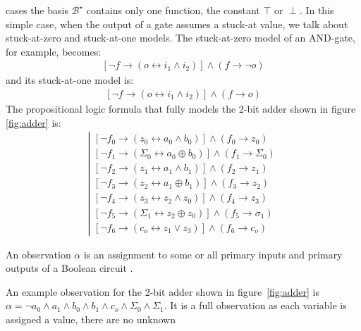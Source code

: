 \documentclass{article}
\begin{document}
cases the basis $\mathcal{B}^\star$ contains only one function, the
constant $\top$ or $\perp$. In this
simple case, when the output of a gate assumes a stuck-at value, we
talk about stuck-at-zero and stuck-at-one models. The stuck-at-zero
model of an AND-gate, for example, becomes:
%
\begin{eqnarray}
  \left[\neg{f} \rightarrow (o \leftrightarrow i_1 \wedge i_2)\right]
  \wedge (f \rightarrow \neg{o})
\end{eqnarray}
%
and its stuck-at-one model is:
%
\begin{eqnarray}
  \left[\neg{f} \rightarrow (o \leftrightarrow i_1 \wedge i_2)\right]
  \wedge (f \rightarrow o)
\end{eqnarray}
%
The propositional logic formula that fully models the 2-bit adder
shown in figure \ref{fig:adder} is:
%
\begin{eqnarray}\label{eqn:adder_model}
\left|
\begin{array}{l}
\left[\neg{f_0} \rightarrow (z_0 \leftrightarrow a_0 \wedge b_0)\right] \wedge (f_0 \rightarrow z_0) \\
\left[\neg{f_1} \rightarrow (\Sigma_0 \leftrightarrow a_0 \oplus b_0)\right] \wedge (f_1 \rightarrow \Sigma_0) \\
\left[\neg{f_2} \rightarrow (z_1 \leftrightarrow a_1 \wedge b_1)\right] \wedge (f_2 \rightarrow z_1) \\
\left[\neg{f_3} \rightarrow (z_2 \leftrightarrow a_1 \oplus b_1)\right] \wedge (f_3 \rightarrow z_2) \\
\left[\neg{f_4} \rightarrow (z_3 \leftrightarrow z_2 \wedge z_0)\right] \wedge (f_4 \rightarrow z_3) \\
\left[\neg{f_5} \rightarrow (\Sigma_1 \leftrightarrow z_2 \oplus z_0)\right] \wedge (f_5 \rightarrow \sigma_1) \\
\left[\neg{f_6} \rightarrow (c_o \leftrightarrow z_1 \vee z_3)\right] \wedge (f_6 \rightarrow c_o)
\end{array}
\right.
\end{eqnarray}
%
\begin{definition}[Observation]
  An observation $\alpha$ is an assignment to some or all primary
  inputs and primary outputs of a Boolean circuit \sd.
\end{definition}
%
An example observation for the 2-bit adder shown in
figure~\ref{fig:adder} is $\alpha = \neg{a_0} \wedge a_1 \wedge b_0
\wedge b_1 \wedge c_o \wedge \Sigma_0 \wedge \Sigma_1$. It is a full
observation as each variable is assigned a value, there are no unknown
\end{document}
